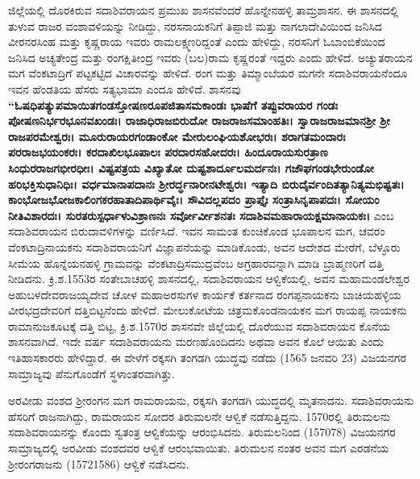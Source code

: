 ಜಿಲ್ಲೆಯಲ್ಲಿ ದೊರಕಿರುವ ಸದಾಶಿವರಾಯನ ಪ್ರಮುಖ ಶಾಸನವೆಂದರೆ ಹೊನ್ನೇನಹಳ್ಳಿ ತಾಮ್ರಶಾಸನ. ಈ ಶಾಸನದಲ್ಲಿ ತುಳುವ ರಾಜರ ವಂಶಾವಳಿಯನ್ನು ನೀಡಿದ್ದು, ನರಸನಾಯಕನಿಗೆ ತಿಪ್ಪಾಜಿ ಮತ್ತು ನಾಗಲಾದೇವಿಯಿಂದ ಜನಿಸಿದ ವೀರನರಸಿಂಹ ಮತ್ತು ಕೃಷ್ಣರಾಯ ಇವರು ರಾಮಲಕ್ಷ್ಮಣರಿದ್ದಂತೆ ಎಂದು ಹೇಳಿದ್ದು, ನರಸನಿಗೆ ಓಬಾಂಬಿಕೆಯಿಂದ ಜನಿಸಿದ ಅಚ್ಯತೇಂದ್ರ ಮತ್ತು ರಂಗಕ್ಷಿತೀಂದ್ರ ಇವರು (ಬಲ)ರಾಮ ಕೃಷ್ಣರಂತೆ ಇದ್ದರು ಎಂದು ಹೇಳಿದೆ. ಅಚ್ಯುತರಾಯನ ಮಗ ವೆಂಕಟಾದ್ರಿಗೆ ಪಟ್ಟಕಟ್ಟಿದ ವಿಚಾರವನ್ನು ಹೇಳಿದೆ. ರಂಗ ಮತ್ತು ತಿಮ್ಮಾಂಬೆಯರ ಮಗನೇ ಸದಾಶಿವರಾಯನೆಂದೂ ಇವನ ಹೆಂಡತಿಯ ಹೆಸರು ಸತ್ಯಭಾಮಾ ಎಂದೂ ಹೇಳಿದೆ. ಶಾಸನವು \textbf{“ಓಷಧಿಪತ್ಯುಪಮಾಯಿತಗಂಡಸ್ತೋಷಣರೂಪಜಿತಾಸಮಕಾಂಡಃ ಭಾಷೆಗೆ ತಪ್ಪುವರಾಯರ ಗಂಡಃ ಪೋಷಣನಿರ್ಭರಭೂನವಖಂಡಃ। ರಾಜಾಧಿರಾಜಬಿರುದೋ ರಾಜರಾಜಸಮಾಂಹತಿಃ। ಸ್ವಾರಾಜರಾಜಮಾನಶ‍್ರೀ ಶ‍್ರೀ ರಾಜಪರಮೇಶ್ವರಃ। ಮೂರುರಾಯರಗಂಡಾಂಕೋ ಮೇರುಲಂಘಿಯಶೋಭರಃ। ಶರಾಗತಮಂದಾರಃ ಪರರಾಜಭಯಂಕರಃ। ಕರದಾಖಿಲಭೂಪಾಲಃ ಪರದಾರಸಹೋದರಃ। ಹಿಂದೂರಾಯಸುರತ್ರಾಣ ಸಿಂಧುರರಾಜಗಭೀರಧೀಃ। ವಿಷ್ಟಪತ್ರಯ ವಿಖ್ಯಾತೋ ದುಷ್ಟಶಾರ್ದೂಲಮರ್ದನಃ। ಗಜೌಘಗಂಡಭೇರುಂಡೋ ಹರಿಭಕ್ತಿಸುಧಾನಿಧಿಃ। ವರ್ಧಮಾನಾಪದಾನಃ ಶ‍್ರೀರರ್ದ್ಧನಾರೀನಟೇಶ್ವರಃ। ಇತ್ಯಾದಿ ಬಿರುದೈರ್ವಂದಿತತ್ಯಾನಿತ್ಯಮಭಿಷ್ಟತಃ। ಕಾಂಭೋಜಭೋಜಕಾಲಿಂಗಕರಹಾತಾದಿಪಾರ್ಥಿವೈಃ। ಸೌವಿದಲ್ಲಪದಂ ಪ್ರಾಪ್ತೈಃ ಸಂತ್ರಾಸಿನೃಪಾಪದಃ। ಸೋಯಂ ನೀತಿವಿಶಾರದಃ। ಸುರತರುಸ್ಪರ್ಧಾಳುವಿಶ್ರಾಣನಃ ಸರ್ವೋರ್ವೀಶನತಃ ಸದಾಶಿವಮಹಾರಾಯಕ್ಷಮಾನಾಯಕಃ।} ಎಂಬ ಸದಾಶಿವರಾಯನ ಬಿರುದಾವಳಿಗಳನ್ನು ವರ್ಣಿಸಿದೆ. ಇವನ ಸಾಮಂತ ಕುಂಚಿಕೊಂಡ ಭೂಪಾಲನ ಮಗ, ಚವರಂ ವೆಂಕಟಾದ್ರಿನಾಯಕನು ಸದಾಶಿವರಾಯನಿಗೆ ವಿಜ್ಞಾಪನೆಯನ್ನು ಮಾಡಿಕೊಂಡು, ಅವನ ಆದೇಶದ ಮೇರೆಗೆ, ಬೆಳ್ಳೂರು ಸೀಮೆಯ ಹೊನ್ನೆಯನಹಳ್ಳಿ ಗ್ರಾಮವನ್ನು ವೆಂಕಟಾದ್ರಿಸಮುದ್ರವೆಂಬ ಅಗ್ರಹಾರವನ್ನಾಗಿ ಮಾಡಿ ಬ್ರಾಹ್ಮಣರಿಗೆ ದತ್ತಿ ನೀಡಿದನು. ಕ್ರಿ.ಶ.1553ರ ಸಂತೇಬಾಚಹಳ್ಳಿ ಶಾಸನದಲ್ಲಿ, ಸದಾಶಿವರಾಯನ ಆಳ್ವಿಕೆಯಲ್ಲಿ, ಅವನ ಮಹಾಮಂಡಲೇಶ್ವರ ಅಹುಬಳದೇವರಾಜಯ್ಯದೇವ ಚೋಳ ಮಹಾಅರಸುಗಳ ಕಾರ್ಯಕೆ ಕರ್ತನಾದ ರಂಗಪ್ಪನಾಯಕನು ಬಾಚಿಯಹಳ್ಳಿಯ ವೀರಭದ್ರದೇವರಿಗೆ ದತ್ತಿಬಿಟ್ಟನೆಂದು ಹೇಳಿದೆ. ಮೇಲುಕೋಟೆಯ ಚಿತ್ರಮಕೊಂಡನಾಯಕನ ಮಗ ರಾಯಪ್ಪ ನಾಯಕನು ರಾಮಾನುಜಕೂಟಕ್ಕೆ ದತ್ತಿ ಬಿಟ್ಟ, ಕ್ರಿ.ಶ.1570ರ ಶಾಸನವೇ ಜಿಲ್ಲೆಯಲ್ಲಿ ದೊರೆಯುವ ಸದಾಶಿವರಾಯನ ಕೊನೆಯ ಶಾಸನವಾಗಿದೆ. ಇದೇ ವರ್ಷ ಸದಾಶಿವರಾಯನು ಮರಣಹೊಂದಿದನು ಅಥವಾ ಅವನ ಕೊಲೆ ಆಯಿತು ಎಂದು ಇತಿಹಾಸಕಾರರು ಹೇಳಿದ್ದಾರೆ. ಈ ವೇಳೆಗೆ ರಕ್ಕಸಗಿ ತಂಗಡಗಿ ಯುದ್ಧವು ನಡೆದು (1565 ಜನವರಿ 23) ವಿಜಯನಗರ ಸಾಮ್ರಾಜ್ಯವು ಪೆನುಗೊಂಡೆಗೆ ಸ್ಥಳಾಂತರವಾಗಿತ್ತು.

ಅರವೀಡು ವಂಶದ ಶ‍್ರೀರಂಗನ ಮಗ ರಾಮರಾಯನು, ರಕ್ಕಸಗಿ ತಂಗಡಗಿ ಯುದ್ಧದಲ್ಲಿ ಮೃತನಾದನು. ಸದಾಶಿವರಾಯನು ಹೆಸರಿಗೆ ರಾಜನಾಗಿದ್ದು, ರಾಮರಾಯನ ಸೋದರ ತಿರುಮಲನೇ ಆಳ್ವಿಕೆ ನಡೆಸುತ್ತಿದ್ದನು. 1570ರಲ್ಲಿ ತಿರುಮಲನು ಸದಾಶಿವರಾಯನನ್ನು ಕೊಂದು ಸ್ವತಂತ್ರ ಆಳ್ವಿಕೆಯನ್ನು ಆರಂಭಿಸಿದನು. ತಿರುಮಲನಿಂದ (1570\enginline{-}78) ವಿಜಯನಗರ ಸಾಮ್ರಾಜ್ಯದಲ್ಲಿ ಅರವೀಡು ವಂಶದವರ ಆಳ್ವಿಕೆ ಆರಂಭವಾಯಿತು. ತಿರುಮಲನ ನಂತರ ಅವನ ಮಗ ಎರಡನೆಯ ಶ‍್ರೀರಂಗರಾಜನು (1572\enginline{-}1586) ಆಳ್ವಿಕೆ ನಡೆಸಿದನು.


